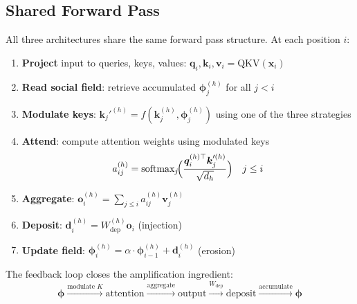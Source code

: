 \documentclass[11pt,a4paper]{article}
\newcommand{\field}{\bm{\phi}}
\newcommand{\retain}{\alpha}
\newcommand{\x}{\bm{x}}
\newcommand{\q}{\bm{q}}
\newcommand{\K}{\bm{k}}
\newcommand{\vv}{\bm{v}}
\begin{document}
\subsection{Shared Forward Pass}

All three architectures share the same forward pass structure.  At
each position $i$:
\begin{enumerate}
    \item \textbf{Project} input to queries, keys, values:
          $\q_i, \K_i, \vv_i = \text{QKV}(\x_i)$
    \item \textbf{Read social field}: retrieve accumulated
          $\field_j^{(h)}$ for all $j < i$
    \item \textbf{Modulate keys}: $\K_j'^{(h)} = f(\K_j^{(h)},
          \field_j^{(h)})$ using one of the three strategies
    \item \textbf{Attend}: compute attention weights using modulated
          keys
          \begin{equation}
              a_{ij}^{(h)} = \text{softmax}_j\!\Bigl(
              \frac{\q_i^{(h)\top} \K_j'^{(h)}}{\sqrt{d_h}}
              \Bigr) \quad j \leq i
          \end{equation}
    \item \textbf{Aggregate}: $\bm{o}_i^{(h)} = \sum_{j \leq i}
          a_{ij}^{(h)} \vv_j^{(h)}$
    \item \textbf{Deposit}: $\bm{d}_i^{(h)} = W_{\text{dep}}^{(h)}
          \bm{o}_i$ \quad (injection)
    \item \textbf{Update field}: $\field_i^{(h)} = \retain \cdot
          \field_{i-1}^{(h)} + \bm{d}_i^{(h)}$ \quad (erosion)
\end{enumerate}

The feedback loop closes the amplification ingredient:
\begin{equation}
    \field \xrightarrow{\text{modulate } K}
    \text{attention} \xrightarrow{\text{aggregate}}
    \text{output} \xrightarrow{W_{\text{dep}}}
    \text{deposit} \xrightarrow{\text{accumulate}} \field
\end{equation}
\end{document}
